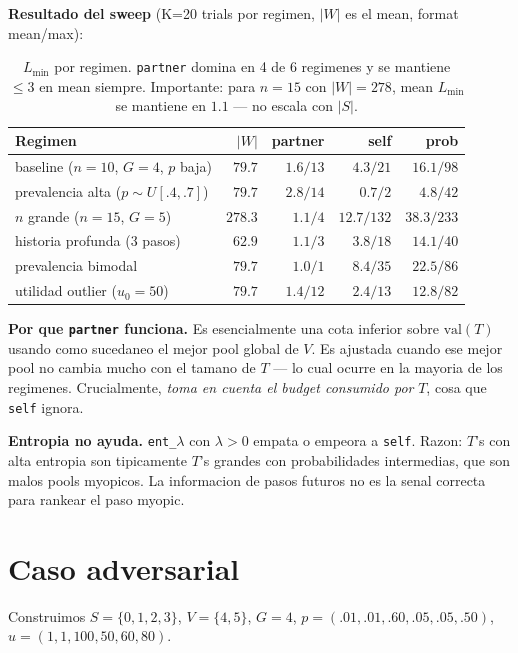 \documentclass[11pt]{article}
\begin{document}
\textbf{Resultado del sweep} (K=20 trials por regimen, $|W|$ es el
mean, format mean/max):

\begin{table}[h]
\centering
\begin{tabular}{l r r r r}
\toprule
Regimen & $|W|$ & partner & self & prob \\
\midrule
baseline ($n=10$, $G=4$, $p$ baja) & $79.7$ & $\mathbf{1.6}/13$ & $4.3/21$ & $16.1/98$ \\
prevalencia alta ($p \sim U[.4,.7]$) & $79.7$ & $2.8/14$ & $\mathbf{0.7}/2$ & $4.8/42$ \\
$n$ grande ($n=15$, $G=5$) & $278.3$ & $\mathbf{1.1}/4$ & $12.7/132$ & $38.3/233$ \\
historia profunda (3 pasos) & $62.9$ & $\mathbf{1.1}/3$ & $3.8/18$ & $14.1/40$ \\
prevalencia bimodal & $79.7$ & $\mathbf{1.0}/1$ & $8.4/35$ & $22.5/86$ \\
utilidad outlier ($u_0 = 50$) & $79.7$ & $\mathbf{1.4}/12$ & $2.4/13$ & $12.8/82$ \\
\bottomrule
\end{tabular}
\caption{$L_{\min}$ por regimen. \texttt{partner} domina en 4 de 6
regimenes y se mantiene $\le 3$ en mean siempre. Importante: para
$n=15$ con $|W| = 278$, mean $L_{\min}$ se mantiene en $1.1$ — no
escala con $|S|$.}
\end{table}

\textbf{Por que \texttt{partner} funciona.} Es esencialmente una cota
inferior sobre $\text{val}(T)$ usando como sucedaneo el mejor pool
global de $V$. Es ajustada cuando ese mejor pool no cambia mucho con
el tamano de $T$ — lo cual ocurre en la mayoria de los regimenes.
Crucialmente, \emph{toma en cuenta el budget consumido por} $T$, cosa
que \texttt{self} ignora.

\textbf{Entropia no ayuda.} \texttt{ent\_$\lambda$} con $\lambda > 0$
empata o empeora a \texttt{self}. Razon: $T$'s con alta entropia son
tipicamente $T$'s grandes con probabilidades intermedias, que son
malos pools myopicos. La informacion de pasos futuros no es la senal
correcta para rankear el paso myopic.

\section{Caso adversarial}

Construimos $S = \{0,1,2,3\}$, $V = \{4,5\}$, $G = 4$,
$p = (.01, .01, .60, .05, .05, .50)$,
$u = (1, 1, 100, 50, 60, 80)$.
\end{document}
